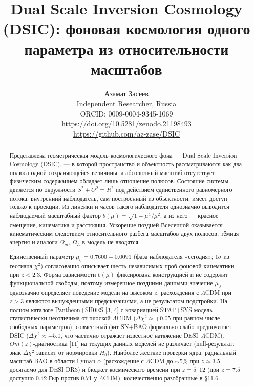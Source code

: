\documentclass{article}
\begin{document}
\title{Dual Scale Inversion Cosmology (DSIC): фоновая космология одного параметра из относительности масштабов}

\author{Азамат Засеев\\
Independent Researcher, Russia\\
ORCID: 0009-0004-9345-1069\\
\url{https://doi.org/10.5281/zenodo.21198493}\\
\url{https://github.com/az-zase/DSIC}}

\date{}
\maketitle

\begin{abstract}
Представлена геометрическая модель космологического фона --- Dual Scale Inversion Cosmology (DSIC), --- в которой пространство и объектность рассматриваются как два полюса одной сохраняющейся величины, а абсолютный масштаб отсутствует: физическим содержанием обладает лишь отношение полюсов. Состояние системы движется по окружности $S^2 + O^2 = R^2$ под действием единственного равномерного потока; внутренний наблюдатель, сам построенный из объектности, имеет доступ только к проекции. Из линейки и часов такого наблюдателя однозначно выводится наблюдаемый масштабный фактор $b(\mu) = \sqrt{1-\mu^2}/\mu^2$, а из него --- красное смещение, кинематика и расстояния. Ускорение поздней Вселенной оказывается кинематическим следствием относительного разбега масштабов двух полюсов; тёмная энергия и аналоги $\Omega_m$, $\Omega_\Lambda$ в модель не вводятся.

Единственный параметр $\mu_0 = 0.7600 \pm 0.0091$ (фаза наблюдателя «сегодня»; $1\sigma$ из гессиана $\chi^2$) согласованно описывает шесть независимых проб фоновой кинематики при $z < 2.3$. Форма зависимости $b(\mu)$ фиксирована конструкцией и не содержит функциональной свободы, поэтому измеренное поздними данными значение $\mu_0$ однозначно определяет поведение модели на высоком $z$: расхождения с $\Lambda$CDM при $z > 3$ являются вынужденными предсказаниями, а не результатом подстройки. На полном каталоге Pantheon+SH0ES [3, 4] с ковариацией STAT+SYS модель статистически неотличима от плоской $\Lambda$CDM ($\Delta\chi^2 \approx +0.05$ при равном числе свободных параметров); совместный фит SN+BAO формально слабо предпочитает DSIC ($\Delta\chi^2 \approx -5.0$, что частично отражает известное натяжение DESI--$\Lambda$CDM). $Om(z)$-диагностика [11] на текущих данных моделей не различает (null-результат: знак $\Delta\chi^2$ зависит от нормировки $H_0$). Наиболее жёсткие проверки ядра: радиальный масштаб BAO в области Lyman-$\alpha$ (расхождение с $\Lambda$CDM до ${\sim}5\%$ при $z \approx 3.5$, досягаемо для DESI DR3) и бюджет космического времени при $z = 5\text{--}12$ (при $z = 7.5$ доступно 0.42 Гыр против 0.71 у $\Lambda$CDM), количественно разобранные в \S11.6.


\end{abstract}
\end{document}
